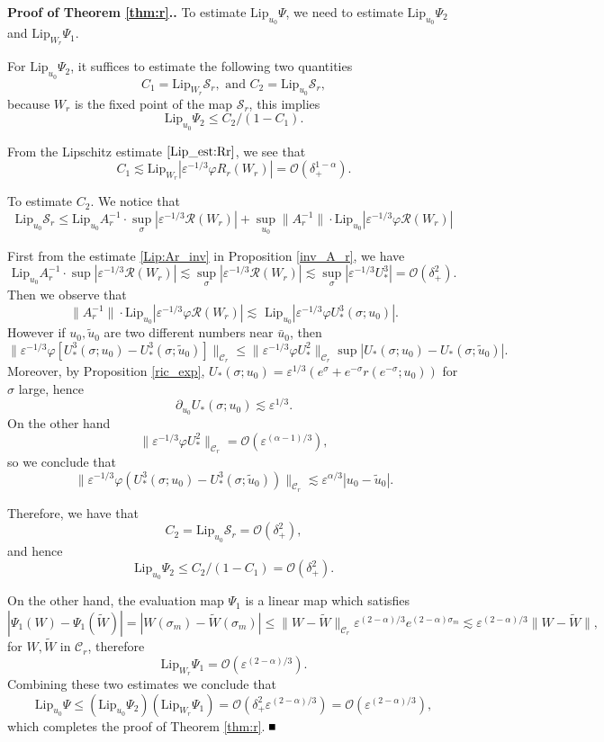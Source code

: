 \documentclass[letterpaper,11pt]{article}
\newcommand{\rmO}{\mathcal{O}}
\newcommand{\eps}{\varepsilon}
\newcommand{\lar}{ \lesssim }
\numberwithin{equation}{section}
\theoremstyle{plain}
\newenvironment{Proof}[1][\unskip]%
 {\begin{trivlist} \item[]{\bf Proof #1. }}%
 {\hspace*{\fill}$\rule{.4\baselineskip}{.4\baselineskip}$\end{trivlist}}
\begin{document}
\begin{Proof}[ of Theorem \ref{thm:r}.]
To estimate $\text{Lip}_{u_0} \Psi$, we need to estimate $\text{Lip}_{u_0} \Psi_2$ and $\text{Lip}_{W_r} \Psi_1$.

For $\text{Lip}_{u_0} \Psi_2$, it suffices to estimate the following two quantities
\[
C_1 = \text{Lip}_{W_r} \mathcal{S}_r, \text{ and }C_2 = \text{Lip}_{u_0} \mathcal{S}_r,
\]
because $W_r$ is the fixed point of the map $\mathcal{S}_r$, this implies
\[
\text{Lip}_{u_0} \Psi_2 \le  C_2/(1-C_1).
\]

From the Lipschitz estimate $\eqref{Lip_est:Rr}$, we see that
\[
C_1 \lar \text{Lip}_{W_r} |\eps^{-1/3}\varphi R_r(W_r)| = \rmO(\delta_+^{1-\alpha}).
\]

To estimate $C_2$. We notice that 
\[
\text{Lip}_{u_0} \mathcal{S}_r \le \text{Lip}_{u_0} A_r^{-1} \cdot \sup_{\sigma}|\eps^{-1/3}\mathcal{R}(W_r)|+ \sup_{u_0}\|A_r^{-1}\| \cdot \text{Lip}_{u_0} |\eps^{-1/3}\varphi\mathcal{R}(W_r)|
\]

First from the estimate \eqref{Lip:Ar_inv} in Proposition \ref{inv_A_r}, we have
\[
\text{Lip}_{u_0}  A_r^{-1}  \cdot \sup|\eps^{-1/3}\mathcal{R}(W_r)| \lar \sup_{\sigma}|\eps^{-1/3}\mathcal{R}(W_r)| \lar \sup_{\sigma}|\eps^{-1/3}U_*^3| =  \rmO(\delta_+^2).
\]
Then we observe that
\[
\|A_r^{-1}\| \cdot \text{Lip}_{u_0} |\eps^{-1/3}\varphi\mathcal{R}(W_r)| \lar \text{ Lip}_{u_0} |\eps^{-1/3}\varphi U_*^3(\sigma;u_0) |.
\]
However if $u_0, \tilde{u}_0$ are two different numbers near $\bar{u}_0$, then
\[
\|\eps^{-1/3}\varphi [U_*^3(\sigma;u_0)-U_*^3(\sigma;\tilde{u}_0)] \|_{\mathcal{C}_r} \le \|\eps^{-1/3}\varphi U_*^2 \|_{\mathcal{C}_r} \sup|U_*(\sigma;u_0)-U_*(\sigma;\tilde{u}_0)|.
\] 
Moreover, by Proposition \ref{ric_exp},
$U_*(\sigma;u_0)= \eps^{1/3}(e^\sigma + e^{-\sigma} r(e^{-\sigma}; u_0))$ for $\sigma$ large, hence 
\[
\partial_{u_0} U_*(\sigma;u_0) \lar \eps^{1/3}.
\]
On the other hand
\[
\|\eps^{-1/3}\varphi U_*^2 \|_{\mathcal{C}_r}  = \rmO(\eps^{(\alpha-1)/3}),
\]
so we conclude that
\[
\|\eps^{-1/3}\varphi (U_*^3(\sigma;u_0)-U_*^3(\sigma;\tilde{u}_0)) \|_{\mathcal{C}_r} \lar\eps^{\alpha/3}|u_0 - \tilde{u}_0|.
\]

Therefore, we have that
\[
C_2 = \text{Lip}_{u_0} \mathcal{S}_r = \rmO(\delta_+^2),
\]
and hence
\[
\text{Lip}_{u_0} \Psi_2 \le C_2/(1-C_1)= \rmO(\delta_+^2).
\]

On the other hand, the evaluation map $\Psi_1$ is a linear map which satisfies
\[
|\Psi_1(W)-\Psi_1(\widetilde{W})| = |W(\sigma_m) -\widetilde{W}(\sigma_m) | \le\|W - \widetilde{W}\|_{\mathcal{C}_r}\eps^{(2-\alpha)/3} e^{(2-\alpha)\sigma_m} \lar \eps^{(2-\alpha)/3}\|W-\widetilde{W}\|,
\]
for $W,\widetilde{W}$ in $\mathcal{C}_r$, therefore
\[
\text{Lip}_{W_r} \Psi_1 = \rmO(\eps^{(2-\alpha)/3}).
\]
Combining these two estimates we conclude that 
\[
\text{Lip}_{u_0} \Psi \le \left( \text{Lip}_{u_0} \Psi_2 \right) \left( \text{Lip}_{W_r} \Psi_1 \right) = \rmO(\delta_+^2\eps^{(2-\alpha)/3})=\rmO(\eps^{(2-\alpha)/3}),
\] 
which completes the proof of Theorem \ref{thm:r}.
\end{Proof}
\end{document}
